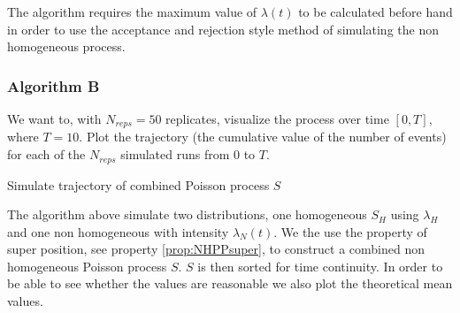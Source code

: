 The algorithm requires the maximum value of $\lambda(t)$ to be calculated before hand in order to use the acceptance and rejection style method of simulating the non homogeneous process.


\subsubsection{Algorithm B}
\label{sec:alg3B}

We want to, with $N_{reps} = 50$ replicates, visualize the process over time $[0,T]$, where $T=10$.
Plot the trajectory (the cumulative value of the number of events) for each of the $N_{reps}$ simulated runs from 0 to $T$.


\begin{algorithm}[H]
    \label{alg:3Bsimulate}
    \caption{\;Simulate trajectory of combined Poisson process $S$}
\end{algorithm}

The algorithm above simulate two distributions, one homogeneous $S_H$ using $\lambda_H$ and one non homogeneous with intensity $\lambda_N(t)$. We the use the property of super position, see property \ref{prop:NHPPsuper}, to construct a combined non homogeneous Poisson process $S$. $S$ is then sorted for time continuity.
In order to be able to see whether the values are reasonable we also plot the theoretical mean values.

